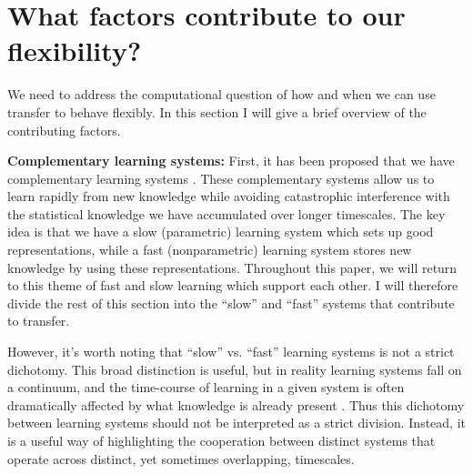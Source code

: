 \section{What factors contribute to our flexibility?}
We need to address the computational question of how and when we can use transfer to behave flexibly. In this section I will give a brief overview of the contributing factors. \par 

\textbf{Complementary learning systems:} First, it has been proposed that we have complementary learning systems \citep{McClelland1995, Kumaran2016}. These complementary systems allow us to learn rapidly from new knowledge while avoiding catastrophic interference \citep{McCloskey1989} with the statistical knowledge we have accumulated over longer timescales. The key idea is that we have a slow (parametric) learning system which sets up good representations, while a fast (nonparametric) learning system stores new knowledge by using these representations. Throughout this paper, we will return to this theme of fast and slow learning which support each other. I will therefore divide the rest of this section into the ``slow'' and ``fast'' systems that contribute to transfer.\par
However, it's worth noting that ``slow'' vs. ``fast'' learning systems is not a strict dichotomy. This broad distinction is useful, but in reality learning systems fall on a continuum, and the time-course of learning in a given system is often dramatically affected by what knowledge is already present \citep[e.g.][]{McClelland2013}. Thus this dichotomy between learning systems should not be interpreted as a strict division. Instead, it is a useful way of highlighting the cooperation between distinct systems that operate across distinct, yet sometimes overlapping, timescales. \par 

